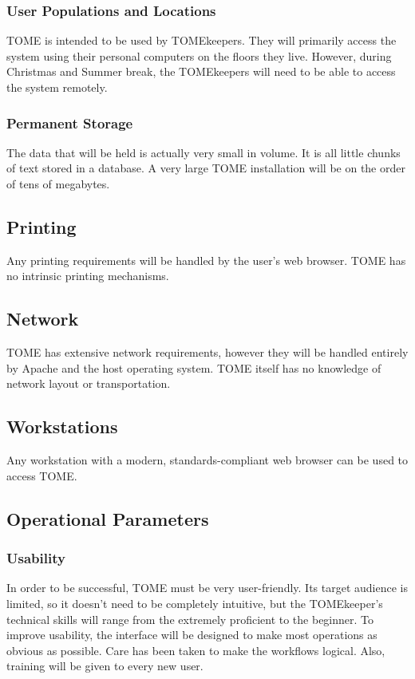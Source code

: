 \documentclass[12pt,titlepage]{article}
\begin{document}
\subsubsection{User Populations and Locations}
TOME is intended to be used by TOMEkeepers.  They will primarily access the system using their personal computers on the floors they live.  However, during Christmas and Summer break, the TOMEkeepers will need to be able to access the system remotely.
\subsubsection{Permanent Storage}
The data that will be held is actually very small in volume.  It is all little chunks of text stored in a database.  A very large TOME installation will be on the order of tens of megabytes.
\subsection{Printing}
Any printing requirements will be handled by the user's web browser.  TOME has no intrinsic printing mechanisms.
\subsection{Network}
TOME has extensive network requirements, however they will be handled entirely by Apache and the host operating system.  TOME itself has no knowledge of network layout or transportation.
\subsection{Workstations}
Any workstation with a modern, standards-compliant web browser can be used to access TOME.
\subsection{Operational Parameters}
\subsubsection{Usability}
In order to be successful, TOME must be very user-friendly.  Its target audience is limited, so it doesn't need to be completely intuitive, but the TOMEkeeper's technical skills will range from the extremely proficient to the beginner.  To improve usability, the interface will be designed to make most operations as obvious as possible.  Care has been taken to make the workflows logical.  Also, training will be given to every new user.
\end{document}
